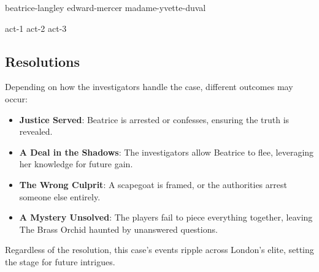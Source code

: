 \BeginBoxPage
	\begin{multicols}{2}
		{beatrice-langley}
		\vspace{2\baselineskip}
		{edward-mercer}
		\newcolumn
		{madame-yvette-duval}
	\end{multicols}
\EndBoxPage

{act-1}
{act-2}
{act-3}

\newcolumn
\subsection{Resolutions} 
Depending on how the investigators handle the case, different outcomes may occur:
\begin{itemize}
	\item \textbf{Justice Served}: Beatrice is arrested or confesses, ensuring the truth is revealed.
	\item \textbf{A Deal in the Shadows}: The investigators allow Beatrice to flee, leveraging her knowledge for future gain.
	\item \textbf{The Wrong Culprit}: A scapegoat is framed, or the authorities arrest someone else entirely.
	\item \textbf{A Mystery Unsolved}: The players fail to piece everything together, leaving The Brass Orchid haunted by unanswered questions.
\end{itemize}

Regardless of the resolution, this case's events ripple across London’s elite, setting the stage for future intrigues.
